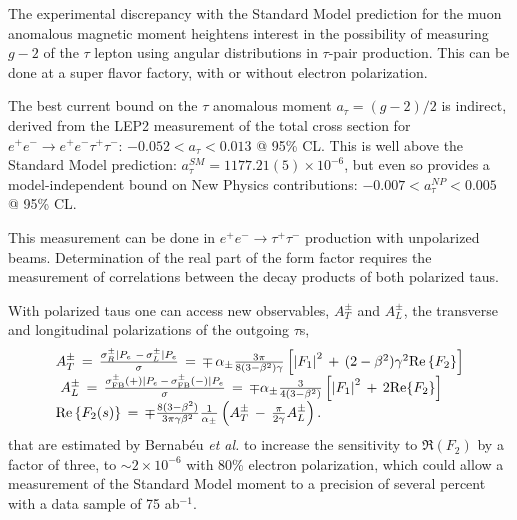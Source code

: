 The experimental discrepancy with the Standard Model prediction for
the muon anomalous magnetic moment heightens interest in the
possibility of measuring $g-2$ of the $\tau$ lepton using angular
distributions in $\tau$-pair production. This can be done at a super flavor factory, with or without electron polarization.  

The best current bound on the $\tau$ anomalous moment  $a_{\tau}=(g-2)/2$ is indirect, derived from the LEP2 measurement of the total cross section for $e^+e^- \rightarrow e^+e^- \tau^+\tau^-$: $-0.052 < a_\tau < 0.013$ @ 95\% CL. This is well above the Standard Model prediction: $a_\tau^{SM} = 1177.21(5) \times 10^{-6}$, but even so provides a model-independent bound on New Physics contributions:  $-0.007 < a_\tau^{NP} < 0.005$ @ 95\% CL.  \cite{GonzalezSprinberg:2000mk}

This measurement can be done in $e^+ e^- \rightarrow \tau^+\tau^-$ production with unpolarized beams. Determination of the real part of the form factor requires the measurement of correlations between the decay products of both polarized taus. 

With polarized taus one can access new observables, $A_T^\pm$ and $A_L^\pm$, the transverse and longitudinal polarizations of the outgoing $\tau$s,
\[\begin{array}{l}
A_T^ \pm \, = \,\frac{{\sigma _R^ \pm |{P_e}\,\, - \,\sigma _L^ \pm |{P_e}}}{\sigma }\, = \, \mp \,{\alpha _ \pm }\frac{{3\pi }}{{8(3 - {\beta ^2})\gamma }}\left[ {{{\left| {{F_1}} \right|}^2}\, + \,(2 - {\beta ^2}){\gamma ^2}{\mathop{\rm Re}\nolimits} \left\{ {{F_2}} \right\}} \right]\\
\,\,A_L^ \pm \, = \,\frac{{\sigma _{{\rm{FB}}}^ \pm ( + )|{P_e}\, - \,\sigma _{{\rm{FB}}}^ \pm ( - )|{P_e}}}{\sigma }\, = \, \mp {\alpha _ \pm }\frac{3}{{4(3 - {\beta ^2})}}\left[ {{{\left| {{F_1}} \right|}^2}\, + \,2{\mathop{\rm Re}\nolimits} \{ {F_2}\} } \right]\\
{\rm{                  Re}}\left\{ {{F_2}(s)} \right\}\, = \, \mp \frac{{8(3 - {\beta ^2})}}{{3\pi \gamma {\beta ^2}}}\frac{1}{{{\alpha _ \pm }}}\left( {A_T^ \pm \, - \,\frac{\pi }{{2\gamma }}A_L^ \pm } \right).
\end{array}\]
that are estimated by
Bernab\'eu {\it et al.}\cite{ref:b1} to increase the sensitivity to
$\Re(F_2)$ by a factor of three, to $\sim2\times 10^{-6}$ with 80\%
electron polarization, which could allow a measurement of the Standard
Model moment to a precision of several percent with a data sample of
75 ab$^{-1}$. 

